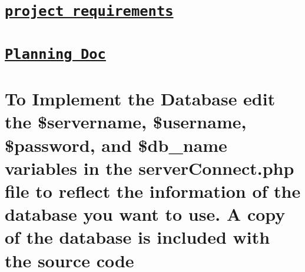 \section*{\href{https://wiki.ittc.ku.edu/ittc_wiki/index.php/EECS448:Project1}{\tt project requirements}}

\section*{\href{https://docs.google.com/document/d/1ZJA5ylYeOnR_NBRTtAjRwvixRXUndpHy_WWtUqpyD1c/edit?usp=sharing}{\tt Planning Doc}}

\section*{To Implement the Database edit the \$servername, \$username, \$password, and \$db\+\_\+name variables in the \textquotesingle{}server\+Connect.\+php\textquotesingle{} file to reflect the information of the database you want to use. A copy of the database is included with the source code}